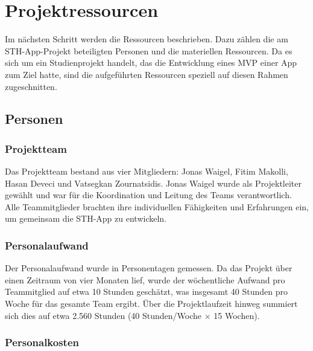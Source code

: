 \chapter{Projektressourcen}
Im nächsten Schritt werden die Ressourcen beschrieben. Dazu zählen die am STH-App-Projekt beteiligten Personen und die materiellen Ressourcen.
Da es sich um ein Studienprojekt handelt, das die Entwicklung eines MVP einer App zum Ziel hatte, sind die aufgeführten Ressourcen speziell auf diesen Rahmen zugeschnitten.

\section{Personen}
\subsection{Projektteam}
Das Projektteam bestand aus vier Mitgliedern: Jonas Waigel, Fitim Makolli, Hasan Deveci und Vatsegkan Zournatsidis.
Jonas Waigel wurde als Projektleiter gewählt und war für die Koordination und Leitung des Teams verantwortlich.
Alle Teammitglieder brachten ihre individuellen Fähigkeiten und Erfahrungen ein, um gemeinsam die STH-App zu entwickeln.

\subsection{Personalaufwand}
Der Personalaufwand wurde in Personentagen gemessen. Da das Projekt über einen Zeitraum von vier Monaten lief, wurde der wöchentliche Aufwand pro Teammitglied auf etwa 10 Stunden geschätzt, was insgesamt 40 Stunden pro Woche für das gesamte Team ergibt. 
Über die Projektlaufzeit hinweg summiert sich dies auf etwa 2.560 Stunden (40 Stunden/Woche × 15 Wochen).


\subsection{Personalkosten}

